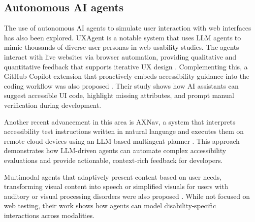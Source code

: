 \subsection{Autonomous AI agents}

The use of autonomous \ac{AI} agents to simulate user interaction with web interfaces has also been explored. UXAgent is a notable system that uses LLM agents to mimic thousands of diverse user personas in web usability studies. The agents interact with live websites via browser automation, providing qualitative and quantitative feedback that supports iterative UX design \cite{lu2025uxagent}. Complementing this, a GitHub Copilot extension that proactively embeds accessibility guidance into the coding workflow was also proposed \cite{mowar2025codea11y}. Their study shows how \ac{AI} assistants can suggest accessible UI code, highlight missing attributes, and prompt manual verification during development.

Another recent advancement in this area is AXNav, a system that interprets accessibility test instructions written in natural language and executes them on remote cloud devices using an LLM-based multiagent planner \cite{taeb2024axnav}. This approach demonstrates how LLM-driven agents can automate complex accessibility evaluations and provide actionable, context-rich feedback for developers.

Multimodal agents that adaptively present content based on user needs, transforming visual content into speech or simplified visuals for users with auditory or visual processing disorders were also proposed \cite{rajagopal2023design}. While not focused on web testing, their work shows how agents can model disability-specific interactions across modalities.


